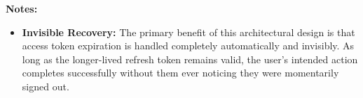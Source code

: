 \vspace{0.2cm}
\noindent\textbf{Notes:}
\begin{itemize}
    \item \textbf{Invisible Recovery:} The primary benefit of this architectural design is that access token expiration is handled completely automatically and invisibly. As long as the longer-lived refresh token remains valid, the user's intended action completes successfully without them ever noticing they were momentarily signed out.
\end{itemize}